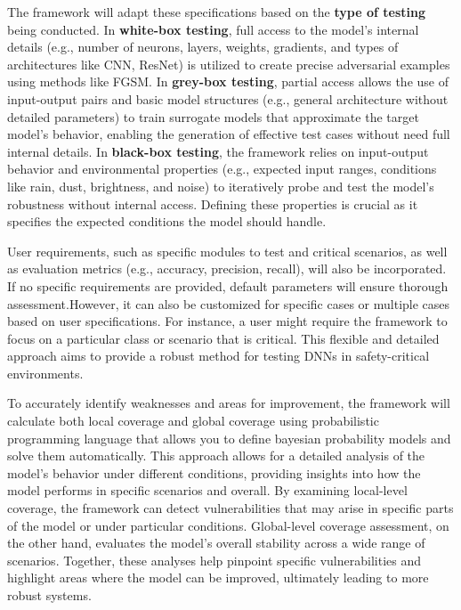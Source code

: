 The framework will adapt these specifications based on the \textbf{type of testing} being conducted. In \textbf{white-box testing}, full access to the model's internal details (e.g., number of neurons, layers, weights, gradients, and types of architectures like CNN, ResNet) is utilized to create precise adversarial examples using methods like FGSM. In \textbf{grey-box testing}, partial access allows the use of input-output pairs and basic model structures (e.g., general architecture without detailed parameters) to train surrogate models that approximate the target model's behavior, enabling the generation of effective test cases without need full internal details. In \textbf{black-box testing}, the framework relies on input-output behavior and environmental properties (e.g., expected input ranges, conditions like rain, dust, brightness, and noise) to iteratively probe and test the model's robustness without internal access. Defining these properties is crucial as it specifies the expected conditions the model should handle.

User requirements, such as specific modules to test and critical scenarios, as well as evaluation metrics (e.g., accuracy, precision, recall), will also be incorporated. If no specific requirements are provided, default parameters will ensure thorough assessment.However, it can also be customized for specific cases or multiple cases based on user specifications. For instance, a user might require the framework to focus on a particular class or scenario that is critical. This flexible and detailed approach aims to provide a robust method for testing DNNs in safety-critical environments.


To accurately identify weaknesses and areas for improvement, the framework will calculate both local coverage and global coverage using probabilistic programming language that allows you to define bayesian probability models and solve them automatically. This approach allows for a detailed analysis of the model's behavior under different conditions, providing insights into how the model performs in specific scenarios and overall. By examining local-level coverage, the framework can detect vulnerabilities that may arise in specific parts of the model or under particular conditions. Global-level coverage assessment, on the other hand, evaluates the model's overall stability across a wide range of scenarios. Together, these analyses help pinpoint specific vulnerabilities and highlight areas where the model can be improved, ultimately leading to more robust systems.

